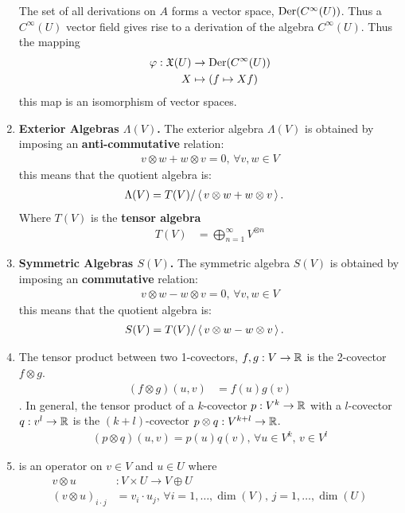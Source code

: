 \documentclass[10pt,a4paper]{report}
\begin{document}
\begin{enumerate}
	The set of all derivations on $A$ forms a vector space, $\operatorname{Der}(C^\infty(U))$.  Thus a $C^\infty(U)$ vector field gives rise to a derivation of the algebra $C^\infty(U)$.  Thus the mapping
	\begin{align*}
		\varphi : \mathfrak{X}(U) &\to \operatorname{Der}(C^\infty(U)) \\
		X &\mapsto (f\mapsto Xf)
	\end{align*}this map is an isomorphism of vector spaces.
	\item \textbf{Exterior Algebras $\Lambda(V)$.} The exterior algebra $\Lambda(V)$ is obtained by imposing an \textbf{anti-commutative} relation: 
	\begin{align*}
		v\otimes w + w\otimes v = 0,\, \forall v,w \in V
	\end{align*}this means that the quotient algebra is:
	\begin{align*}
		\Lambda(V) &= T(V)/\left \langle\, v\otimes w + w\otimes v \,\right \rangle.
	\end{align*}Where $T(V)$ is the \textbf{tensor algebra}
	\begin{align*}
		T(V) &= \bigoplus_{n=1}^\infty V^{\otimes n}
	\end{align*}
	\item \textbf{Symmetric Algebras $S(V)$.} The symmetric algebra $S(V)$ is obtained by imposing an \textbf{commutative} relation: 
	\begin{align*}
		v\otimes w - w\otimes v = 0,\, \forall v,w \in V
	\end{align*}this means that the quotient algebra is:
	\begin{align*}
		S(V) &= T(V)/\left \langle\, v\otimes w - w\otimes v \,\right \rangle.
	\end{align*}
	\item {} The tensor product between two 1-covectors, $f,g: V \to \mathbb{R}$ is the 2-covector $f\otimes g$.
	\begin{align*}
		(f \otimes g)(u,v) &= f(u)g(v)
	\end{align*}.  In general, the tensor product of a $k$-covector $p:V^k \to \mathbb{R}$ with a $l$-covector $q:v^l \to \mathbb{R}$ is the $(k+l)$-covector $p\otimes q: V^{k+l}\to \mathbb{R}$.
	\begin{align*}
		(p\otimes q)(u,v) = p(u)q(v),\,\forall u\in V^k,\, v\in V^l
	\end{align*}
	\item {} is an operator on $v \in V$ and $u \in U$ where 
	\begin{align*}
		v \otimes u &: V \times U \to V \oplus U \\
		(v \otimes u)_{i\cdot j} &= v_i \cdot u_j,\, \forall i=1,\dots,\dim(V),\, j=1,\dots,\dim(U)
	\end{align*}
	

\end{enumerate}
\end{document}
